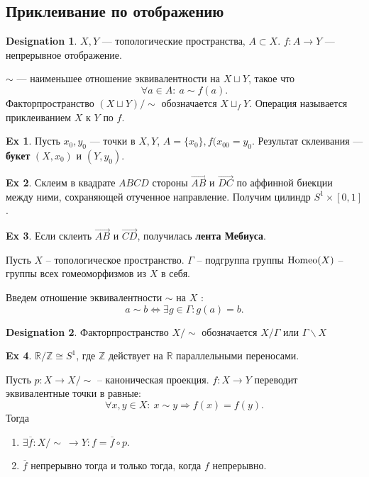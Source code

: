 \documentclass[11pt]{book}
\newcommand{\Z}{\mathbb{Z}}
\newcommand{\R}{\mathbb{R}}
\theoremstyle{definition}
\theoremstyle{plain}
\theoremstyle{plain}
\theoremstyle{definition}
\newtheorem*{ex}{Ex}
\newtheorem*{name}{Designation}
\theoremstyle{remark}
\begin{document}
\subsection{Приклеивание по отображению}
\begin{name}
    $ X, Y$ ---  топологические пространства, $ A \subset X$.
    $ f: A \to  Y$ --- непрерывное отображение.
\end{name}
\begin{defn}
    $ \sim $ --- наименьшее отношение эквивалентности на $ X \sqcup Y$, такое что \[
	\forall a \in  A: ~a \sim f(a)
    .\]
    Факторпространство $ (X \sqcup Y) / \!\sim $ обозначается $ X \sqcup_f Y$. Операция называется приклеиванием  $ X$ к  $ Y$ по  $ f$.
\end{defn}
\begin{ex}
    Пусть $ x_0, y_0$ --- точки в $ X, Y$,  $ A = \{x_0\}, f(x_{00} = y_0$.
    Результат склеивания --- {\bf букет} $ (X, x_0)$ и $(Y, y_0)$.
\end{ex}
\begin{ex}
    Склеим в квадрате $ ABCD$ стороны  $\overrightarrow{AB}$ и $ \overrightarrow{DC}$ по аффинной биекции между ними, сохраняющей отученное направление. Получим цилиндр $ S^{1} \times [0, 1]$.
\end{ex}
\begin{ex}
    Если склеить $ \overrightarrow{AB}$ и $ \overrightarrow{CD}$, получилась  { \bf лента Мебиуса}.
\end{ex}
\begin{defn}
    Пусть $ X $ -- топологическое пространство. $ \Gamma$ -- подгруппа группы $ {\rm Homeo}(X)$ -- группы всех гомеоморфизмов из $ X$ в себя.

    Введем отношение эквивалентности $ \sim $ на $ X$ :
    \[
	a \sim b \Longleftrightarrow \exists  g \in  \Gamma : g(a) = b
    .\]
    \begin{name}
	Факторпространство $ X /\sim $  обозначается $ X / \Gamma$ или $ \Gamma \backslash X$
    \end{name}
\end{defn}
\begin{ex}
    $ \R / \Z \cong S^{1}$, где $ \Z$ действует на $ \R$  параллельными переносами.
\end{ex}
\begin{thm}\label{th_gomeo}
    Пусть $ p : X \to  X/ \!\sim $ -- каноническая проекция. $ f: X \to  Y$ переводит эквивалентные точки в равные:
    \[
	\forall  x, y \in  X: ~ x \sim y \Longrightarrow f(x) = f(y)
    .\]
    Тогда
    \begin{enumerate}
	\item $ \exists  \overline{f}: X /\!\sim~ \to  Y: f = \overline{f} \circ p$.
	\item  $ \overline{f}$ непрерывно тогда и только тогда, когда  $ f$ непрерывно.
    \end{enumerate}
\end{thm}
\end{document}
